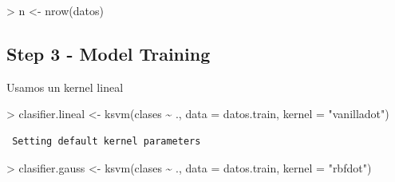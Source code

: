 \documentclass[
]{article}
\newenvironment{Shaded}{\begin{snugshade}}{\end{snugshade}}
\newcommand{\AttributeTok}[1]{\textcolor[rgb]{0.80,0.80,0.80}{#1}}
\newcommand{\CommentTok}[1]{\textcolor[rgb]{0.50,0.62,0.50}{#1}}
\newcommand{\ErrorTok}[1]{\textcolor[rgb]{0.76,0.75,0.62}{#1}}
\newcommand{\FunctionTok}[1]{\textcolor[rgb]{0.94,0.94,0.56}{#1}}
\newcommand{\NormalTok}[1]{\textcolor[rgb]{0.80,0.80,0.80}{#1}}
\newcommand{\OtherTok}[1]{\textcolor[rgb]{0.94,0.94,0.56}{#1}}
\newcommand{\SpecialCharTok}[1]{\textcolor[rgb]{0.86,0.64,0.64}{#1}}
\newcommand{\StringTok}[1]{\textcolor[rgb]{0.80,0.58,0.58}{#1}}
\begin{document}
\begin{Shaded}
\begin{Highlighting}[]
\SpecialCharTok{\textgreater{}}\NormalTok{ n }\OtherTok{\textless{}{-}} \FunctionTok{nrow}\NormalTok{(datos)}
\end{Highlighting}
\end{Shaded}

\begin{Shaded}
\end{Shaded}

\hypertarget{step-3---model-training}{%
\subsection{Step 3 - Model Training}\label{step-3---model-training}}

Usamos un kernel lineal

\begin{Shaded}
\begin{Highlighting}[]
\SpecialCharTok{\textgreater{}}\NormalTok{ clasifier.lineal }\OtherTok{\textless{}{-}} \FunctionTok{ksvm}\NormalTok{(clases }\SpecialCharTok{\textasciitilde{}}\NormalTok{ ., }\AttributeTok{data =}\NormalTok{ datos.train, }\AttributeTok{kernel =} \StringTok{"vanilladot"}\NormalTok{)}
\end{Highlighting}
\end{Shaded}

\begin{verbatim}
 Setting default kernel parameters  
\end{verbatim}

\begin{Shaded}
\begin{Highlighting}[]
\SpecialCharTok{\textgreater{}}\NormalTok{ clasifier.gauss }\OtherTok{\textless{}{-}} \FunctionTok{ksvm}\NormalTok{(clases }\SpecialCharTok{\textasciitilde{}}\NormalTok{ ., }\AttributeTok{data =}\NormalTok{ datos.train, }\AttributeTok{kernel =} \StringTok{"rbfdot"}\NormalTok{)}
\end{Highlighting}
\end{Shaded}
\end{document}
